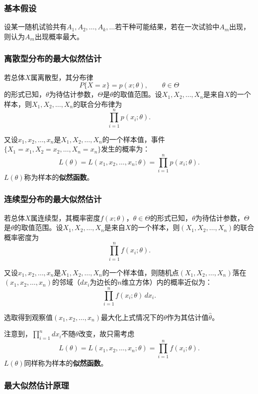 \documentclass[11pt,a4paper]{report}
\theoremstyle{definition}
\begin{document}
\subsubsection*{基本假设}

设某一随机试验共有$A_{1},A_{2},\ldots,A_{k},\ldots$若干种可能结果，若在一次试验中$A_{m}$出现，则认为$A_{m}$出现概率最大。

\subsubsection*{离散型分布的最大似然估计}

若总体$X$属离散型，其分布律
\[
P\{X=x\}=p(x;\theta),\qquad \theta\in\Theta
\]
的形式已知，$\theta$为待估计参数，$\Theta$是$\theta$的取值范围。设$X_{1},X_{2},\ldots,X_{n}$是来自$X$的一个样本，则$X_{1},X_{2},\ldots,X_{n}$的联合分布律为
\[
\prod_{i=1}^{n}p(x_{i};\theta).
\]

又设$x_{1},x_{2},\ldots,x_{n}$是$X_{1},X_{2},\ldots,X_{n}$的一个样本值，事件$\{X_{1}=x_{1},X_{2}=x_{2},\ldots,X_{n}=x_{n}\}$发生的概率为：
\[
L(\theta)=L(x_{1},x_{2},\ldots,x_{n};\theta)=\prod_{i=1}^{n}p(x_{i};\theta).
\]
$L(\theta)$称为样本的\textbf{似然函数}。

\subsubsection*{连续型分布的最大似然估计}

若总体$X$属连续型，其概率密度$f(x;\theta)$，$\theta\in\Theta$的形式已知，$\theta$为待估计参数，$\Theta$是$\theta$的取值范围。设$X_{1},X_{2},\ldots,X_{n}$是来自$X$的一个样本，则$(X_{1},X_{2},\ldots,X_{n})$的联合概率密度为
\[
\prod_{i=1}^{n}f(x_{i};\theta).
\]

又设$x_{1},x_{2},\ldots,x_{n}$是$X_{1},X_{2},\ldots,X_{n}$的一个样本值，则随机点$(X_{1},X_{2},\ldots,X_{n})$落在$(x_{1},x_{2},\ldots,x_{n})$的邻域（$dx_{i}$为边长的$n$维立方体）内的概率近似为：
\[
\prod_{i=1}^{n}f(x_{i};\theta)\,dx_{i}.
\]

选取得到观察值$(x_{1},x_{2},\ldots,x_{n})$最大化上式情况下的$\theta$作为其估计值$\hat{\theta}$。

注意到，$\displaystyle\prod_{i=1}^{n}dx_{i}$不随$\theta$改变，故只需考虑
\[
L(\theta)=L(x_{1},x_{2},\ldots,x_{n};\theta)=\prod_{i=1}^{n}f(x_{i};\theta).
\]
$L(\theta)$同样称为样本的\textbf{似然函数}。

\subsubsection*{最大似然估计原理}
\end{document}
